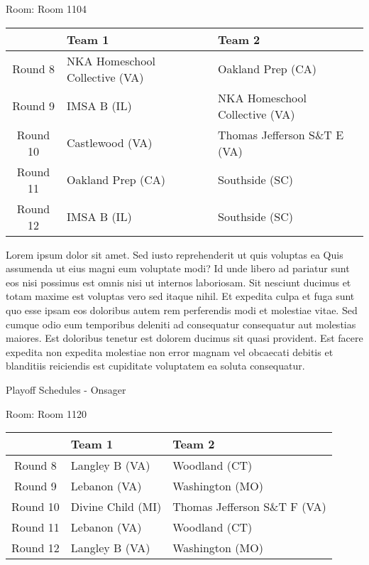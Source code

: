 \documentclass{article}%
\begin{document}
\linebreak%
\begin{flushleft}%
\begin{Large}%
Room: Room 1104%
\end{Large}%
\end{flushleft}%
\begin{tabularx}{\textwidth}{|c|Y|Y|}%
\hline%
&Team 1&Team 2\\%
\hline%
Round 8&NKA Homeschool Collective (VA)&Oakland Prep (CA)\\%
Round 9&IMSA B (IL)&NKA Homeschool Collective (VA)\\%
Round 10&Castlewood (VA)&Thomas Jefferson S\&T E (VA)\\%
Round 11&Oakland Prep (CA)&Southside (SC)\\%
Round 12&IMSA B (IL)&Southside (SC)\\%
\hline%
\end{tabularx}%
\vspace*{8pt}%
\linebreak%
\newline%
Lorem ipsum dolor sit amet. Sed iusto reprehenderit ut quis voluptas ea Quis assumenda ut eius magni eum voluptate modi? Id unde libero ad pariatur sunt eos nisi possimus est omnis nisi ut internos laboriosam. Sit nesciunt ducimus et totam maxime est voluptas vero sed itaque nihil. Et expedita culpa et fuga sunt quo esse ipsam eos doloribus autem rem perferendis modi et molestiae vitae.\newline%
\newline%
Sed cumque odio eum temporibus deleniti ad consequatur consequatur aut molestias maiores. Est doloribus tenetur est dolorem ducimus sit quasi provident. Est facere expedita non expedita molestiae non error magnam vel obcaecati debitis et blanditiis reiciendis est cupiditate voluptatem ea soluta consequatur.%
\newpage%
\begin{center}%
\begin{Huge}%
Playoff Schedules {-} Onsager%
\end{Huge}%
\end{center}%
\begin{flushleft}%
\begin{Large}%
Room: Room 1120%
\end{Large}%
\end{flushleft}%
\begin{tabularx}{\textwidth}{|c|Y|Y|}%
\hline%
&Team 1&Team 2\\%
\hline%
Round 8&Langley B (VA)&Woodland (CT)\\%
Round 9&Lebanon (VA)&Washington (MO)\\%
Round 10&Divine Child (MI)&Thomas Jefferson S\&T F (VA)\\%
Round 11&Lebanon (VA)&Woodland (CT)\\%
Round 12&Langley B (VA)&Washington (MO)\\%
\hline%
\end{tabularx}%
\end{document}
